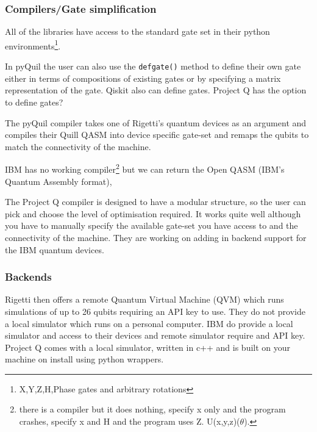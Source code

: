 \subsubsection{Compilers/Gate simplification}

All of the libraries have access to the standard gate set in their python environments\footnote{X,Y,Z,H,Phase gates and arbitrary rotations}. 

In pyQuil the user can also use the \texttt{defgate()} method to define their own gate either in terms of compositions of existing gates or by specifying a matrix representation of the gate. Qiskit also can define gates. Project Q has the option to define gates?

The pyQuil compiler takes one of Rigetti's quantum devices as an argument and compiles their Quill QASM into device specific gate-set and remaps the qubits to match the connectivity of the machine.

IBM has no working compiler\footnote{there is a compiler but it does nothing, specify x only and the program crashes, specify x and H and the program uses Z. U(x,y,z)($\theta$).} but we can return the Open QASM (IBM's Quantum Assembly format), 

The Project Q compiler is designed to have a modular structure, so the user can pick and choose the level of optimisation required. It works quite well although you have to manually specify the available gate-set you have access to and the connectivity of the machine. They are working on adding in backend support for the IBM quantum devices.

\subsubsection{Backends}

Rigetti then offers a remote Quantum Virtual Machine (QVM) which runs simulations of up to 26 qubits requiring an API key to use. They do not provide a local simulator which runs on a personal computer. IBM do provide a local simulator and access to their devices and remote simulator require and API key. Project Q comes with a local simulator, written in c++ and is built on your machine on install using python wrappers.


